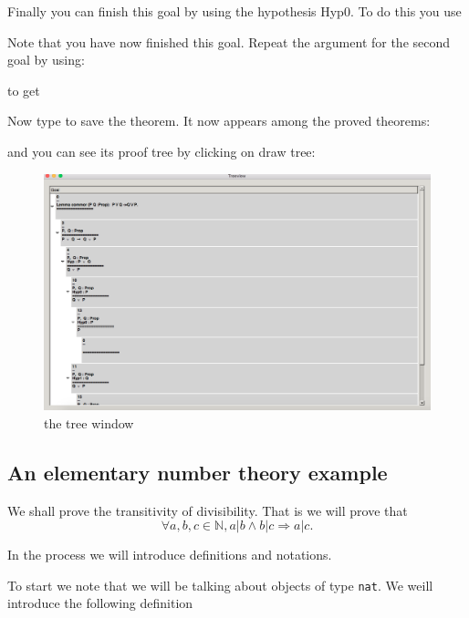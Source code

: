 
Finally you can finish this goal by using the hypothesis Hyp0. To do this you use

Note that you have now finished this goal. Repeat the argument for the second goal by using:


to get 

Now type
to save the theorem. It now appears among the proved theorems:

and you can see its proof tree by clicking on draw tree:


\begin{figure}[h!]
\includegraphics[scale=0.3]{Installation/treecommor.png}
\caption{the tree window}\label{treesearch}
\end{figure}

\subsection{An elementary number theory example}
We shall prove the transitivity of divisibility. That is we will prove that
$$\forall a,b, c \in \mathbb{N},  a |b \land b | c \Rightarrow a | c.$$

In the process we will introduce definitions and notations.

To start we note that we will be talking about objects of type \texttt{nat}. We weill introduce the following definition


